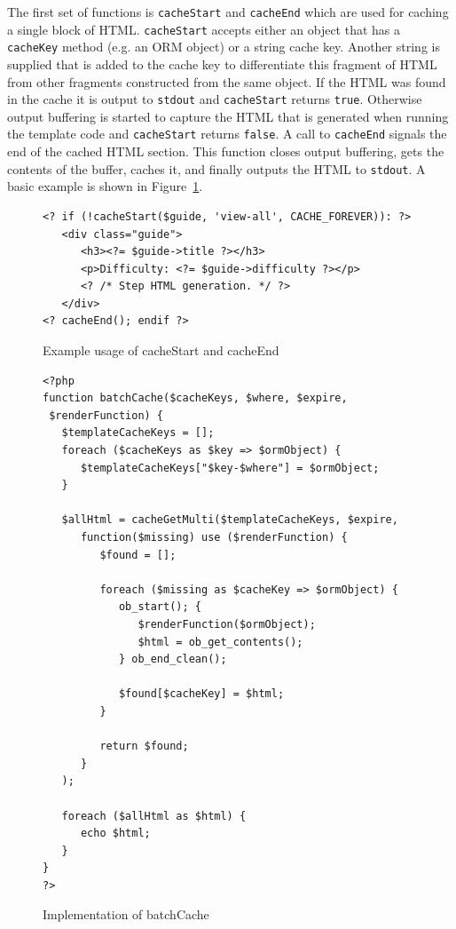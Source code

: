 \documentclass[12pt]{ucthesis}
\begin{document}
The first set of functions is {\tt cacheStart} and {\tt cacheEnd} which are used for caching a single block of HTML.
{\tt cacheStart} accepts either an object that has a {\tt cacheKey} method (e.g. an ORM object) or a string cache key.
Another string is supplied that is added to the cache key to differentiate this fragment of HTML from other fragments constructed from the same object.
If the HTML was found in the cache it is output to {\tt stdout} and {\tt cacheStart} returns {\tt true}.
Otherwise output buffering is started to capture the HTML that is generated when running the template code and {\tt cacheStart} returns {\tt false}.
A call to {\tt cacheEnd} signals the end of the cached HTML section.
This function closes output buffering, gets the contents of the buffer, caches it, and finally outputs the HTML to {\tt stdout}.
A basic example is shown in Figure~\ref{fig:cacheStartExample}.

\begin{figure}[h]
\begin{ssp}
\begin{verbatim}
<? if (!cacheStart($guide, 'view-all', CACHE_FOREVER)): ?>
   <div class="guide">
      <h3><?= $guide->title ?></h3>
      <p>Difficulty: <?= $guide->difficulty ?></p>
      <? /* Step HTML generation. */ ?>
   </div>
<? cacheEnd(); endif ?>
\end{verbatim}
\end{ssp}
\caption{Example usage of cacheStart and cacheEnd}
\label{fig:cacheStartExample}
\end{figure}

\begin{figure}[hbtp]
\begin{ssp}
\begin{verbatim}
<?php
function batchCache($cacheKeys, $where, $expire,
 $renderFunction) {
   $templateCacheKeys = [];
   foreach ($cacheKeys as $key => $ormObject) {
      $templateCacheKeys["$key-$where"] = $ormObject;
   }

   $allHtml = cacheGetMulti($templateCacheKeys, $expire,
      function($missing) use ($renderFunction) {
         $found = [];

         foreach ($missing as $cacheKey => $ormObject) {
            ob_start(); {
               $renderFunction($ormObject);
               $html = ob_get_contents();
            } ob_end_clean();

            $found[$cacheKey] = $html;
         }

         return $found;
      }
   );

   foreach ($allHtml as $html) {
      echo $html;
   }
}
?>
\end{verbatim}
\end{ssp}
\caption{Implementation of batchCache}
\label{fig:batchCacheImplementation}
\end{figure}
\end{document}
